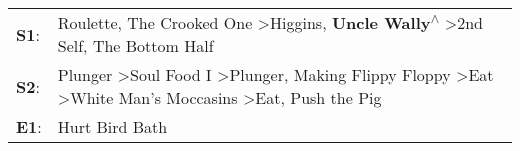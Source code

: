\begin{supertabular}{p{0.03\textwidth}p{0.92\textwidth}}
 \textbf{S1}:  &                                                                                                   Roulette\textsuperscript{}, \enspace The Crooked One\textsuperscript{} \textgreater \enspace Higgins\textsuperscript{}, \enspace \textbf{Uncle Wally\textsuperscript{$\wedge$}} \textgreater \enspace 2nd Self\textsuperscript{}, \enspace The Bottom Half\textsuperscript{}  \enspace  \\
 \textbf{S2}:  &  Plunger\textsuperscript{} \textgreater \enspace Soul Food I\textsuperscript{} \textgreater \enspace Plunger\textsuperscript{}, \enspace Making Flippy Floppy\textsuperscript{} \textgreater \enspace Eat\textsuperscript{} \textgreater \enspace White Man's Moccasins\textsuperscript{} \textgreater \enspace Eat\textsuperscript{}, \enspace Push the Pig\textsuperscript{}  \enspace  \\
 \textbf{E1}:  &                                                                                                                                                                                                                                                                                                                                               Hurt Bird Bath\textsuperscript{}  \enspace  \\
\end{supertabular}
